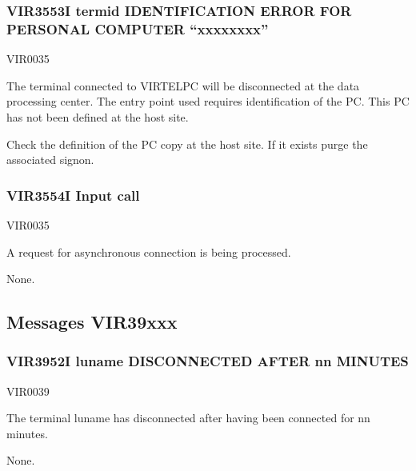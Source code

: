 \documentclass[letterpaper,10pt,english]{sphinxmanual}
\begin{document}
\subsubsection{VIR3553I termid IDENTIFICATION ERROR FOR PERSONAL COMPUTER “xxxxxxxx”}
\label{\detokenize{messages:vir3553i-termid-identification-error-for-personal-computer-xxxxxxxx}}\begin{description}
\sphinxAtStartPar
VIR0035

\sphinxAtStartPar
The terminal connected to VIRTELPC will be disconnected at the data processing center. The entry point used requires identification of the PC. This PC has not been defined at the host site.

\sphinxAtStartPar
Check the definition of the PC copy at the host site. If it exists purge the associated sign\sphinxhyphen{}on.

\end{description}


\subsubsection{VIR3554I Input call}
\label{\detokenize{messages:vir3554i-input-call}}\begin{description}
\sphinxAtStartPar
VIR0035

\sphinxAtStartPar
A request for asynchronous connection is being processed.

\sphinxAtStartPar
None.

\end{description}


\subsection{Messages VIR39xxx}
\label{\detokenize{messages:messages-vir39xxx}}

\subsubsection{VIR3952I luname DISCONNECTED AFTER nn MINUTES}
\label{\detokenize{messages:vir3952i-luname-disconnected-after-nn-minutes}}\begin{description}
\sphinxAtStartPar
VIR0039

\sphinxAtStartPar
The terminal luname has disconnected after having been connected for nn minutes.

\sphinxAtStartPar
None.

\end{description}
\end{document}
